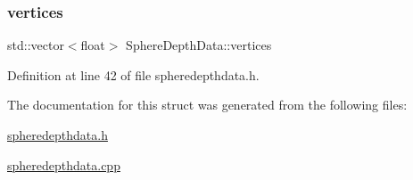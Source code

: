 \subsubsection{\texorpdfstring{vertices}{vertices}}
{\footnotesize\ttfamily std\+::vector$<$float$>$ Sphere\+Depth\+Data\+::vertices\hspace{0.3cm}{\ttfamily [private]}}



Definition at line 42 of file spheredepthdata.\+h.



The documentation for this struct was generated from the following files\+:\begin{DoxyCompactItemize}
\item 
\hyperlink{spheredepthdata_8h}{spheredepthdata.\+h}\item 
\hyperlink{spheredepthdata_8cpp}{spheredepthdata.\+cpp}\end{DoxyCompactItemize}
